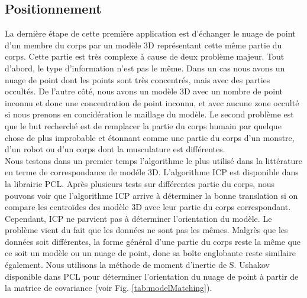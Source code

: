 \subsection{Positionnement}
La dernière étape de cette première application est d'échanger le nuage de point d'un membre du corps par un modèle 3D représentant cette même partie
du corps. Cette partie est très complexe à cause de deux problème majeur. Tout d'abord, le type d'information n'est pas le même. Dans un cas nous avons
un nuage de point dont les points sont très concentrés, mais avec des parties occultés. De l'autre côté, nous avons un modèle 3D avec un nombre de point
inconnu et donc une concentration de point inconnu, et avec aucune zone occulté si nous prenons en concidération le maillage du modèle. Le second problème
est que le but recherché est de remplacer la partie du corps humain par quelque chose de plus improbable et étonnant comme une partie du corps d'un monstre,
d'un robot ou d'un corps dont la musculature est différentes.\\

Nous testons dans un premier temps l'algorithme le plus utilisé dans la littérature en terme de correspondance de modéle 3D. L'algorithme ICP\cite{ICP} est
disponible dans la librairie PCL\cite{PCL}. Après plusieurs tests sur différentes partie du corps, nous pouvons voir que l'algorithme ICP arrive à déterminer
la bonne translation si on compare les centroïdes des modèle 3D avec leur partie du corps correspondant. Cependant, ICP ne parvient pas à déterminer
l'orientation du modèle. Le problème vient du fait que les données ne sont pas les mêmes. Malgrès que les données soit différentes, la forme général
d'une partie du corps reste la même que ce soit un modèle ou un nuage de point, donc sa boîte englobante reste similaire également. Nous utilisons la méthode
de moment d'inertie de S. Ushakov disponible dans PCL pour déterminer l'orientation du nuage de point à partir de la matrice de covariance
(voir Fig. \ref{tab:modelMatching}).\\


